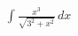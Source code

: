 \documentclass[preview]{standalone}
\begin{document}
\begin{align*}
\int\frac{x^3}{\sqrt{3^2+x^2}} \, dx
\end{align*}
\end{document}
